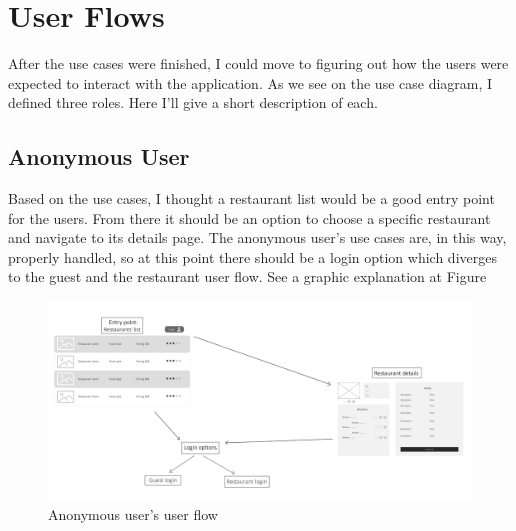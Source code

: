 \section{User Flows}

After the use cases were finished, I could move to figuring out how the users were expected to interact with the application. As we see on the use case diagram, I defined three roles. Here I'll give a short description of each.
\subsection{Anonymous User}\label{AnonUserflow}
 Based on the use cases, I thought a restaurant list would be a good entry point for the users. From there it should be an option to choose a specific restaurant and navigate to its details page. The anonymous user's use cases are, in this way, properly handled, so at this point there should be a login option which diverges to the guest and the restaurant user flow. See a graphic explanation at Figure 
\begin{figure}[!ht]
	\centering
	\includegraphics[width=150mm, keepaspectratio]{figures/UIsAnon.png}
	\caption{Anonymous user's user flow} 
	\label{fig:UIsAnon}
\end{figure}
